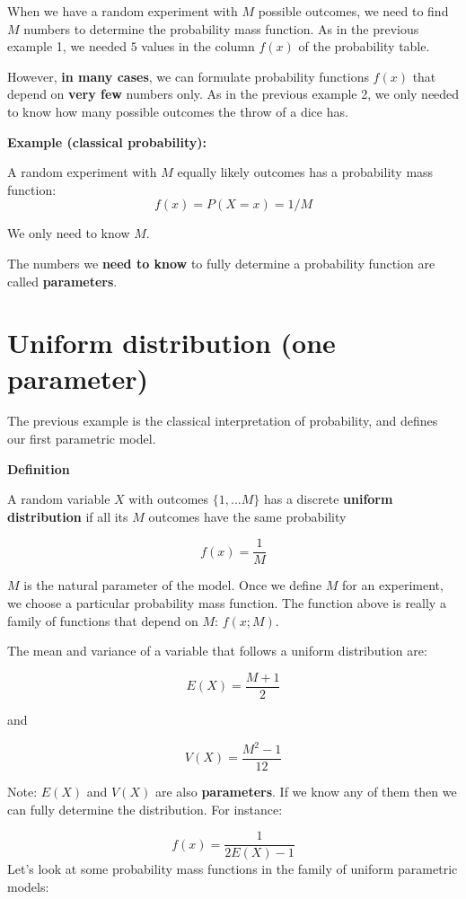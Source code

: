 \documentclass[
]{book}
\begin{document}
When we have a random experiment with \(M\) possible outcomes, we need to find \(M\) numbers to determine the probability mass function. As in the previous example 1, we needed \(5\) values in the column \(f(x)\) of the probability table.

However, \textbf{in many cases}, we can formulate probability functions \(f(x)\) that depend on \textbf{very few} numbers only. As in the previous example 2, we only needed to know how many possible outcomes the throw of a dice has.

\textbf{Example (classical probability):}

A random experiment with \(M\) equally likely outcomes has a probability mass function:
\[f(x)=P(X=x)=1/M\]

We only need to know \(M\).

The numbers we \textbf{need to know} to fully determine a probability function are called \textbf{parameters}.

\hypertarget{uniform-distribution-one-parameter}{%
\section{Uniform distribution (one parameter)}\label{uniform-distribution-one-parameter}}

The previous example is the classical interpretation of probability, and defines our first parametric model.

\textbf{Definition}

A random variable \(X\) with outcomes \(\{1,...M\}\) has a discrete \textbf{uniform distribution} if all its \(M\) outcomes have the same probability

\[f(x)=\frac{1}{M}\]

\(M\) is the natural parameter of the model. Once we define \(M\) for an experiment, we choose a particular probability mass function. The function above is really a family of functions that depend on \(M\): \(f(x; M)\).

The mean and variance of a variable that follows a uniform distribution are:

\[E(X)= \frac{M+1}{2}\]

and

\[V(X)= \frac{M^2-1}{12}\]

Note: \(E(X)\) and \(V(X)\) are also \textbf{parameters}. If we know any of them then we can fully determine the distribution. For instance:

\[f(x)=\frac{1}{2E(X)-1}\]
Let's look at some probability mass functions in the family of uniform parametric models:
\end{document}
